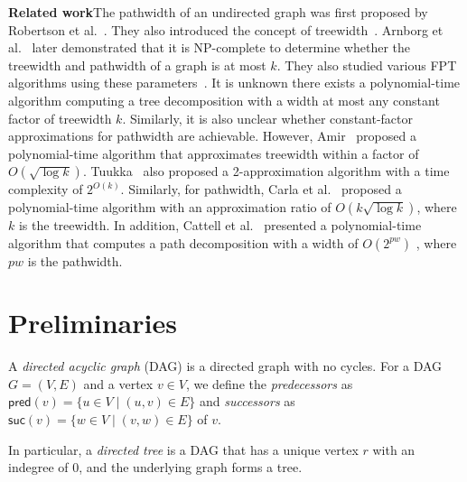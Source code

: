 \documentclass[runningheads]{llncs}
\theoremstyle{plain}
\theoremstyle{definition}
\begin{document}
\vspace{4mm}
\noindent
\textbf{Related work}\quad The pathwidth of an undirected graph was first proposed by Robertson et al.~\cite{art1}. They also introduced the concept of treewidth~\cite{art2}. Arnborg et al.~\cite{art3} later demonstrated that it is NP-complete to determine whether the treewidth and pathwidth of a graph is at most \(k\). They also studied various FPT algorithms using these parameters~\cite{art4}. It is unknown there exists a polynomial-time algorithm computing a tree decomposition with a width at most any constant factor of treewidth $k$. Similarly, it is also unclear whether constant-factor approximations for pathwidth are achievable. However, Amir~\cite{art5} proposed a polynomial-time algorithm that approximates treewidth within a factor of $O(\sqrt{\log k})$. Tuukka~\cite{art6} also proposed a 2-approximation algorithm with a time complexity of $2^{O(k)}$. Similarly, for pathwidth, Carla et al.~\cite{art7} proposed a polynomial-time algorithm with an approximation ratio of $O(k\sqrt{\log k})$, where \( k \) is the treewidth. In addition, Cattell et al.~\cite{art8} presented a polynomial-time algorithm that computes a path decomposition with a width of $O(2^{pw})$ , where $pw$ is the pathwidth.




\section{Preliminaries}\label{chapter2}


A \emph{directed acyclic graph} (DAG) is a directed graph with no cycles. For a DAG $G = (V, E)$ and a vertex $v \in V$, we define the \emph{predecessors} as $\mathsf{pred}(v) = \{ u \in V \mid (u, v) \in E\}$ and \emph{successors} as $\mathsf{suc}(v) = \{ w \in V \mid (v, w) \in E\}$ of $v$.

In particular, a \emph{directed tree} is a DAG that has a unique vertex $r$ with an indegree of 0, and the underlying graph forms a tree.
   
\end{document}
